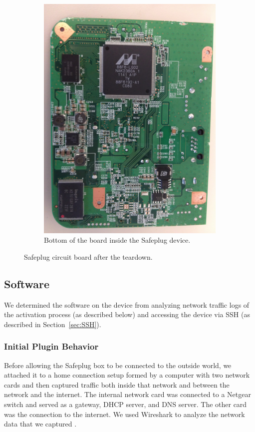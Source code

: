 \begin{figure}[htb]
\begin{subfigure}[b]{.3\textwidth}
  \label{fig:top}
\end{subfigure}%
\qquad
\begin{subfigure}[b]{.3\textwidth}
\includegraphics[width=\textwidth]{safeplug_bottom}
\caption{Bottom of the board inside the Safeplug device.}
\label{fig:bottom}
\end{subfigure}
\caption{Safeplug circuit board after the teardown.}
\end{figure}


\subsection{Software}
\label{software}
We determined the software on the device from analyzing network traffic logs of the activation process (as described below) and accessing the device via SSH (as described in Section~\ref{sec:SSH}).

\subsubsection{Initial Plugin Behavior}
Before allowing the Safeplug box to be connected to the outside world, we attached it to a home connection setup formed by a computer with two network cards and then captured traffic both inside that network and between the network and the internet.  The internal network card was connected to a Netgear switch and served as a gateway, DHCP server, and DNS server.  The other card was the connection to the internet.  We used Wireshark to analyze the network data that we captured \cite{wireshark}.  

